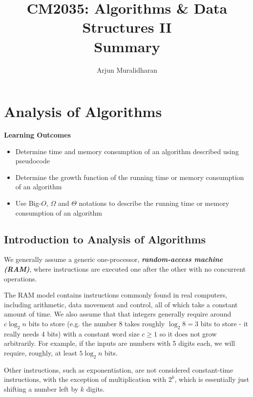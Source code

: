 \title{CM2035: Algorithms \& Data Structures II \\ Summary}
\author{Arjun Muralidharan}




\section{Analysis of Algorithms}
\begin{mdframed}
    \textbf{Learning Outcomes}
    \begin{itemize}[label={\checkmark}]
        \item Determine time and memory consumption of an algorithm described using pseudocode
        \item Determine the growth function of the running time or memory consumption of an algorithm
        \item Use Big-$O$, $\Omega$ and $\Theta$ notations to describe the running time or memory consumption of an algorithm
    \end{itemize}
\end{mdframed}

\subsection{Introduction to Analysis of Algorithms}

We generally assume a generic one-processor, \textbf{\emph{random-access machine (RAM)}}, where instructions are executed one after the other with no concurrent operations.

The RAM model contains instructions commonly found in real computers, including arithmetic, data movement and control, all of which take a constant amount of time. We also assume that that integers generally require around $c \log_{2} n$ bits to store (e.g. the number 8 takes roughly $\log_{2}8=3$ bits to store - it really needs 4 bits) with a constant word size $c \geq 1$ so it does not grow arbitrarily. For example, if the inputs are numbers with 5 digits each, we will require, roughly, at least $5 \log_{2} n$ bits.

Other instructions, such as exponentiation, are not considered constant-time instructions, with the exception of multiplication with $2^k$, which is essentially just shifting a number left by $k$ digits.

